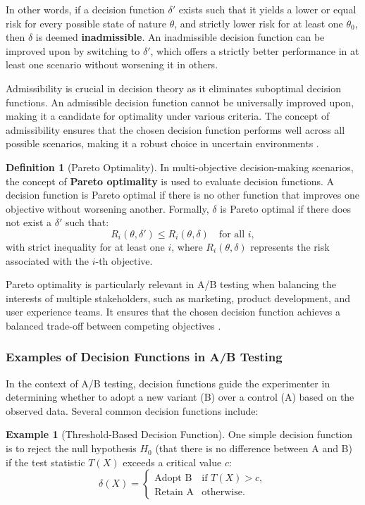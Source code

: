 \documentclass[magisterska, english]{pwr_wmat_praca_dyplomowa}
\theoremstyle{plain}
\numberwithin{theorem}{chapter}
\theoremstyle{definition}
\numberwithin{theorem}{chapter}
\newtheorem{definition}[theorem]{Definition}
\newtheorem{example}[theorem]{Example}
\begin{document}
In other words, if a decision function \( \delta' \) exists such that it yields a lower or equal risk for every possible state of nature \( \theta \), and strictly lower risk for at least one \( \theta_0 \), then \( \delta \) is deemed \textbf{inadmissible}. An inadmissible decision function can be improved upon by switching to \( \delta' \), which offers a strictly better performance in at least one scenario without worsening it in others.

Admissibility is crucial in decision theory as it eliminates suboptimal decision functions. An admissible decision function cannot be universally improved upon, making it a candidate for optimality under various criteria. The concept of admissibility ensures that the chosen decision function performs well across all possible scenarios, making it a robust choice in uncertain environments \cite{Lehmann1998}.

\begin{definition}[Pareto Optimality]
	In multi-objective decision-making scenarios, the concept of \textbf{Pareto optimality} is used to evaluate decision functions. A decision function is Pareto optimal if there is no other function that improves one objective without worsening another. Formally, \( \delta \) is Pareto optimal if there does not exist a \( \delta' \) such that:
	\[
	R_i(\theta, \delta') \leq R_i(\theta, \delta) \quad \text{for all } i,
	\]
	with strict inequality for at least one \( i \), where \( R_i(\theta, \delta) \) represents the risk associated with the \( i \)-th objective.
\end{definition}


Pareto optimality is particularly relevant in A/B testing when balancing the interests of multiple stakeholders, such as marketing, product development, and user experience teams. It ensures that the chosen decision function achieves a balanced trade-off between competing objectives \cite{Miettinen1999}.

\subsubsection{Examples of Decision Functions in A/B Testing}

In the context of A/B testing, decision functions guide the experimenter in determining whether to adopt a new variant (B) over a control (A) based on the observed data. Several common decision functions include:

\begin{example}[Threshold-Based Decision Function]
	One simple decision function is to reject the null hypothesis \( H_0 \) (that there is no difference between A and B) if the test statistic \( T(X) \) exceeds a critical value \( c \):
	\[
	\delta(X) = 
	\begin{cases} 
		\text{Adopt B} & \text{if } T(X) > c, \\
		\text{Retain A} & \text{otherwise}.
	\end{cases}
	\]
\end{example}
\end{document}
